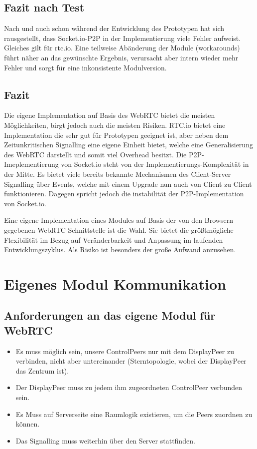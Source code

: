 \subsection{Fazit nach Test}
Nach und auch schon während der Entwicklung des Prototypen hat sich 
rausgestellt, dass Socket.io-P2P in der Implementierung viele Fehler aufweist.
Gleiches gilt für rtc.io.
Eine teilweise Abänderung der Module (workarounds) führt näher an das gewünschte Ergebnis, 
verursacht aber intern wieder mehr Fehler und sorgt für eine inkonsistente Modulversion.



\subsection{Fazit}
Die eigene Implementation auf Basis des WebRTC bietet die meisten Möglichkeiten, birgt jedoch auch die meisten Risiken. 
RTC.io bietet eine Implementation die sehr gut für Prototypen geeignet ist, aber neben dem Zeitunkritischen Signalling eine eigene Einheit bietet, welche eine Generalisierung des WebRTC darstellt und somit viel Overhead besitzt. 
Die P2P-Imeplementierung von Socket.io steht von der Implementierungs-Komplexität in der Mitte. Es bietet viele bereits bekannte Mechanismen des Client-Server Signalling über Events, welche mit einem Upgrade nun auch von Client zu Client funktionieren. Dagegen spricht jedoch die instabilität der P2P-Implementation von Socket.io.

Eine eigene Implementation eines Modules auf Basis der von den Browsern gegebenen WebRTC-Schnittstelle ist die Wahl. Sie bietet die größtmögliche Flexibilität im Bezug auf Veränderbarkeit und Anpassung im laufenden Entwicklungszyklus. Als Risiko ist besonders der große Aufwand anzusehen.



\section{Eigenes Modul Kommunikation}
\subsection{Anforderungen an das eigene Modul für WebRTC}
\begin{itemize}
\item 
Es muss möglich sein, unsere ControlPeers nur mit dem DisplayPeer zu verbinden, 
nicht aber untereinander (Sterntopologie, wobei der DisplayPeer das Zentrum ist).

\item
Der DisplayPeer muss zu jedem ihm zugeordneten ControlPeer verbunden sein.

\item
Es Muss auf Serverseite eine Raumlogik existieren, um die Peers zuordnen zu 
können.

\item
Das Signalling muss weiterhin über den Server stattfinden.
\end{itemize}



